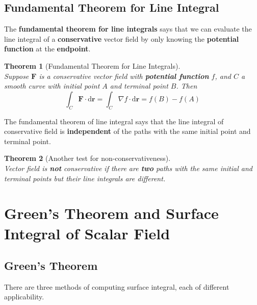 \documentclass[12pt]{article}
\newtheorem{theorem}{Theorem}[section]
\theoremstyle{definition}
\newcommand{\diff}{\mathrm{d}}
\begin{document}
\subsection{Fundamental Theorem for Line Integral}
The \textbf{fundamental theorem for line integrals} says that we can evaluate the line integral of a \textbf{conservative} vector field by only knowing the \textbf{potential function} at the \textbf{endpoint}.
\begin{theorem}[Fundamental Theorem for Line Integrals]
\hfill\\\normalfont Suppose $\mathbf{F}$ is a conservative vector field with \textbf{potential function} $f$, and $C$ a smooth curve with \textit{initial} point $A$ and \textit{terminal} point $B$. Then
\[
\int_C\mathbf{F}\cdot\diff\mathbf{r} = \int_C\nabla f\cdot \diff \mathbf{r} = f(B)-f(A)
\] 
\end{theorem}
The fundamental theorem of line integral says that the line integral of conservative field is \textbf{independent} of the paths with the same initial point and terminal point.\\
\begin{theorem}[Another test for non-conservativeness]
\hfill\\\normalfont Vector field is \textbf{not} conservative if there are \textbf{two} paths with the same initial and terminal points but their line integrals are \textit{different}.
\end{theorem}
\clearpage
\section{Green's Theorem and Surface Integral of Scalar Field}
\subsection{Green's Theorem}
There are three methods of computing surface integral, each of different applicability.
\end{document}
